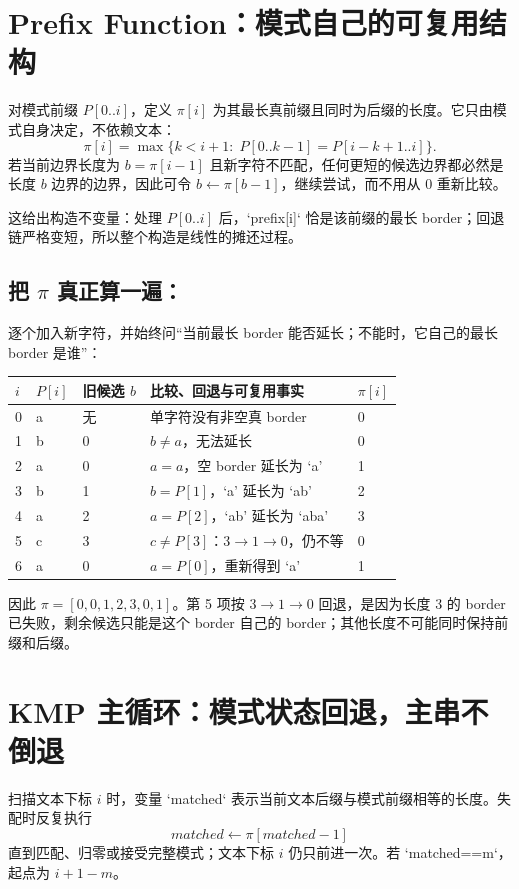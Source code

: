 \documentclass[UTF8,fontset=none,11pt,a4paper]{ctexart}
\begin{document}
\section{Prefix Function：模式自己的可复用结构}
对模式前缀 $P[0..i]$，定义 $\pi[i]$ 为其最长真前缀且同时为后缀的长度。它只由模式自身决定，不依赖文本：
\[
\pi[i]=\max\{k< i+1:\;P[0..k-1]=P[i-k+1..i]\}.
\]
若当前边界长度为 $b=\pi[i-1]$ 且新字符不匹配，任何更短的候选边界都必然是长度 $b$ 边界的边界，因此可令 $b\leftarrow\pi[b-1]$，继续尝试，而不用从 0 重新比较。

这给出构造不变量：处理 $P[0..i]$ 后，`prefix[i]` 恰是该前缀的最长 border；回退链严格变短，所以整个构造是线性的摊还过程。

\subsection{把 \texorpdfstring{$\pi$}{pi} 真正算一遍：}
逐个加入新字符，并始终问“当前最长 border 能否延长；不能时，它自己的最长 border 是谁”：
\begin{center}\small
\begin{tabularx}{\linewidth}{C{0.8cm}C{1.1cm}L{2.7cm}Y C{1.1cm}}
\toprule
$i$ & $P[i]$ & 旧候选 $b$ & 比较、回退与可复用事实 & $\pi[i]$\\
 & a & 无 & 单字符没有非空真 border & 0\\
1 & b & 0 & $b\ne a$，无法延长 & 0\\
2 & a & 0 & $a=a$，空 border 延长为 `a' & 1\\
3 & b & 1 & $b=P[1]$，`a' 延长为 `ab' & 2\\
4 & a & 2 & $a=P[2]$，`ab' 延长为 `aba' & 3\\
5 & c & 3 & $c\ne P[3]$：$3\to1\to0$，仍不等 & 0\\
6 & a & 0 & $a=P[0]$，重新得到 `a' & 1\\
\bottomrule
\end{tabularx}
\end{center}
因此 $\pi=[0,0,1,2,3,0,1]$。第 5 项按 $3\to1\to0$ 回退，是因为长度 3 的 border 已失败，剩余候选只能是这个 border 自己的 border；其他长度不可能同时保持前缀和后缀。

\section{KMP 主循环：模式状态回退，主串不倒退}
扫描文本下标 $i$ 时，变量 `matched` 表示当前文本后缀与模式前缀相等的长度。失配时反复执行
\[
matched\leftarrow\pi[matched-1]
\]
直到匹配、归零或接受完整模式；文本下标 $i$ 仍只前进一次。若 `matched==m`，起点为 $i+1-m$。
\end{document}
